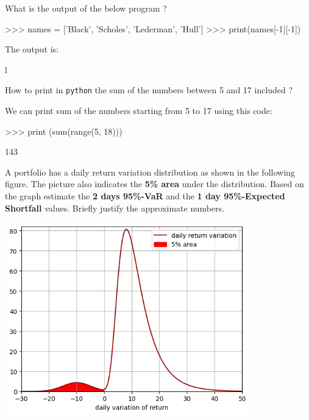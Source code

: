 \documentclass[12pt,a4paper]{exam}
\begin{document}
\begin{questions}

\question What is the output of the below program ?
\begin{ipython}
>>> names = ['Black', 'Scholes', 'Lederman', 'Hull']
>>> print(names[-1][-1])
\end{ipython}
\begin{solution}
The output is: 
\begin{ioutput}
l
\end{ioutput}
\end{solution}

\question
How to print in \texttt{python} the sum of the numbers between 5 and 17 included ?
\makeemptybox{3cm}

\begin{solution}
We can print sum of the numbers starting from 5 to 17 using this code:

\begin{ipython}
>>> print (sum(range(5, 18)))
\end{ipython}
\begin{ioutput}
143
\end{ioutput}
\end{solution}

\question A portfolio has a daily return variation distribution as shown in the following figure. The picture also indicates the \textbf{5\% area} under the distribution. 
Based on the graph estimate the \textbf{2 days 95\%-VaR} and the \textbf{1 day 95\%-Expected Shortfall} values. 
Briefly justify the approximate numbers.
\begin{center}
\includegraphics[width=0.8\textwidth]{var2}
\end{center}
\makeemptybox{3cm}


\end{questions}
\end{document}
